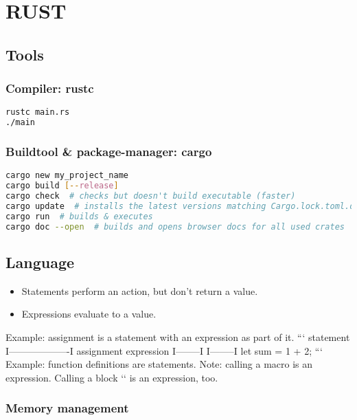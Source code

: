 \section{RUST}

\subsection{Tools}

\subsubsection{Compiler: rustc}
\begin{lstlisting}[language=sh]
rustc main.rs
./main
\end{lstlisting}

\subsubsection{Buildtool & package-manager: cargo}
\begin{lstlisting}[language=sh]
cargo new my_project_name
cargo build [--release]
cargo check  # checks but doesn't build executable (faster)
cargo update  # installs the latest versions matching Cargo.lock.toml.dependencies. updates Cargo.lock
cargo run  # builds & executes
cargo doc --open  # builds and opens browser docs for all used crates
\end{lstlisting}

\subsection{Language}

\begin{itemize}
    \item Statements perform an action, but don't return a value.
    \item Expressions evaluate to a value.
\end{itemize}

Example: assignment is a statement with an expression as part of it.
```
     statement
I-------------------I
assignment expression
I--------I I--------I
let sum  = 1 + 2;
```
Example: function definitions are statements.
Note: calling a macro is an expression. Calling a block `{}` is an expression, too.


\subsubsection{Memory management}

